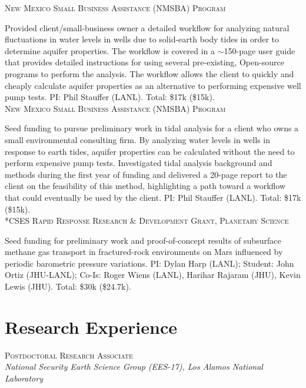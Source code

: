 \documentclass[11pt, letterpaper]{article}
\newcommand{\years}[1]{\marginnote{\scriptsize #1}}
\begin{document}
\years{2021}\textsc{New Mexico Small Business Assistance (NMSBA) Program}

    Provided client/small-business owner a detailed workflow for analyzing
    natural fluctuations in water levels in wells due to solid-earth body tides
    in order to determine aquifer properties. The workflow is covered in a
    $\sim$150-page user guide that provides detailed instructions for using
    several pre-existing, Open-source programs to perform the analysis. The
    workflow allows the client to quickly and cheaply calculate aquifer
    properties as an alternative to performing expensive well pump tests.
	PI: Phil Stauffer (LANL). Total: \$17k (\$15k). \\

\years{2020}\textsc{New Mexico Small Business Assistance (NMSBA) Program}

	Seed funding to pursue preliminary work in tidal analysis for a client who
	owns a small environmental consulting firm. By analyzing water levels in
	wells in response to earth tides, aquifer properties can be calculated
	without the need to perform expensive pump tests.  Investigated tidal
	analysis background and methods during the first year of funding and
	delivered a 20-page report to the client on the feasibility of this method,
	highlighting a path toward a workflow that could eventually be used by the
	client.   
	PI: Phil Stauffer (LANL). Total: \$17k (\$15k). \\

\years{2020}\textsc{*CSES Rapid Response Research \& Development Grant, Planetary
Science}

	Seed funding for preliminary work and proof-of-concept results of
	subsurface methane gas transport in fractured-rock environments on Mars
	influenced by periodic barometric pressure variations.
    PI: Dylan Harp (LANL); Student: John Ortiz (JHU-LANL); Co-Is: Roger Wiens
    (LANL), Harihar Rajaram (JHU), Kevin Lewis (JHU). Total: \$30k (\$24.7k).


\section*{Research Experience}
\setlength{\parindent}{14pt}
\years{2024 - pres.}\textsc{Postdoctoral Research Associate}\\
\textit{National Security Earth Science Group (EES-17), Los Alamos National Laboratory}
\end{document}
